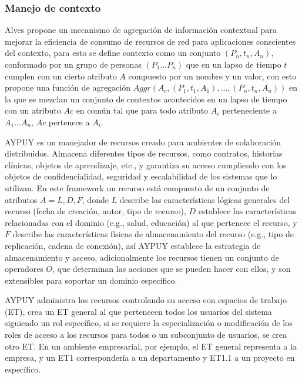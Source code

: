 \subsubsection {Manejo de contexto}

Alves \cite{alves2013radiator} propone un mecanismo de agregaci\'on de informaci\'on contextual para mejorar la eficiencia de consumo de recursos de red para aplicaciones conscientes del contexto, para esto se define contexto como un conjunto $( P_{n},t_{n},A_{n} )$, conformado por un grupo de personas $(  P_{1}...P_{n} )$ que en un lapso de tiempo $t$ cumplen con un cierto atributo $A$ compuesto por un nombre y un valor, con esto propone una funci\'on de agregaci\'on $Aggr( A_{c}, {( P_{1},t_{1},A_{1} ),..., ( P_{n},t_{n},A_{n} )})$ en la que se mezclan un conjunto de contextos acontecidos en un lapso de tiempo con un atributo $Ac$ en com\'un tal que para todo atributo $A_{i}$ perteneciente a $A_{1} ... A_{n}$, $Ac$ pertenece a $A_{i}$.

AYPUY es un manejador de recursos creado para ambientes de colaboraci\'on distribuidos.  Almacena diferentes tipos de recursos, como contratos, historias cl\'inicas, objetos de aprendizaje, etc., y garantiza su acceso cumpliendo con los objetos de confidencialidad, seguridad y escalabilidad de los sistemas que lo utilizan. En este framework un recurso est\'a compuesto de un conjunto de atributos $A = { L, D, F }$, donde $L$ describe las caracter\'isticas l\'ogicas generales del recurso (fecha de creaci\'on, autor, tipo de recurso), $D$ establece las caracter\'isticas relacionadas con el dominio (e.g., salud, educaci\'on) al que pertenece el recurso, y $F$ describe las caracter\'isticas f\'isicas de almacenamiento del recurso (e.g., tipo de replicaci\'on, cadena de conexi\'on), as\'i AYPUY establece la estrategia de almacenamiento y acceso, adicionalmente los recursos tienen un conjunto de operadores $O$, que determinan las acciones que se pueden hacer con ellos, y son extensibles para soportar un dominio espec\'ifico.

AYPUY administra los recursos controlando su acceso con espacios de trabajo (ET), crea un ET general al que pertenecen todos los usuarios del sistema siguiendo un rol espec\'ifico, si se requiere la especializaci\'on o modificaci\'on de los roles de acceso a los recursos para todos o un subconjunto de usuarios, se crea otro ET. En un ambiente empresarial, por ejemplo, el ET general representa a la empresa, y un ET1 corresponder\'ia a un departamento y ET1.1 a un proyecto en espec\'ifico.

